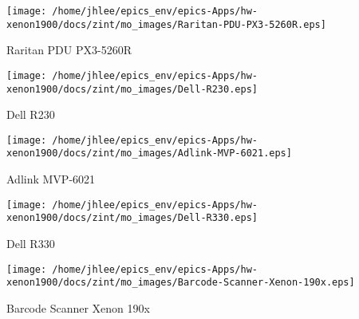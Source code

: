 \noindent
\vspace{1.4cm}
\begin{minipage}{.2\textwidth}
\begin{center}
\texttt{[image: /home/jhlee/epics\_env/epics-Apps/hw-xenon1900/docs/zint/mo\_images/Raritan-PDU-PX3-5260R.eps]}
\end{center}
\end{minipage}
\begin{minipage}{.7\textwidth}
Raritan PDU PX3-5260R
\end{minipage}


\noindent
\vspace{1.4cm}
\begin{minipage}{.2\textwidth}
\begin{center}
\texttt{[image: /home/jhlee/epics\_env/epics-Apps/hw-xenon1900/docs/zint/mo\_images/Dell-R230.eps]}
\end{center}
\end{minipage}
\begin{minipage}{.7\textwidth}
Dell R230
\end{minipage}


\noindent
\vspace{1.4cm}
\begin{minipage}{.2\textwidth}
\begin{center}
\texttt{[image: /home/jhlee/epics\_env/epics-Apps/hw-xenon1900/docs/zint/mo\_images/Adlink-MVP-6021.eps]}
\end{center}
\end{minipage}
\begin{minipage}{.7\textwidth}
Adlink MVP-6021
\end{minipage}


\noindent
\vspace{1.4cm}
\begin{minipage}{.2\textwidth}
\begin{center}
\texttt{[image: /home/jhlee/epics\_env/epics-Apps/hw-xenon1900/docs/zint/mo\_images/Dell-R330.eps]}
\end{center}
\end{minipage}
\begin{minipage}{.7\textwidth}
Dell R330
\end{minipage}


\noindent
\vspace{1.4cm}
\begin{minipage}{.2\textwidth}
\begin{center}
\texttt{[image: /home/jhlee/epics\_env/epics-Apps/hw-xenon1900/docs/zint/mo\_images/Barcode-Scanner-Xenon-190x.eps]}
\end{center}
\end{minipage}
\begin{minipage}{.7\textwidth}
Barcode Scanner Xenon 190x
\end{minipage}


